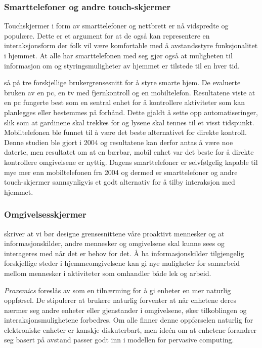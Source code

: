 {\color{blue}

\subsubsection*{Smarttelefoner og andre touch-skjermer}
Touchskjermer i form av smarttelefoner og nettbrett er nå vidspredte og populære. Dette er et argument for at de også kan representere en interaksjonsform der folk vil være komfortable med å avstandsstyre funksjonalitet i hjemmet. At alle har smarttelefonen med seg gjør også at muligheten til informasjon om og styringsmuligheter av hjemmet er tilstede til en hver tid.

\citet{koskela04} så på tre forskjellige brukergrensesnitt for å styre smarte hjem. De evaluerte bruken av en pc, en tv med fjernkontroll og en mobiltelefon. Resultatene viste at en pc fungerte best som en sentral enhet for å kontrollere aktiviteter som kan planlegges eller bestemmes på forhånd. Dette gjaldt å sette opp automatiseringer, slik som at gardinene skal trekkes for og lysene skal tennes til et visst tidspunkt. Mobiltelefonen ble funnet til å være det beste alternativet for direkte kontroll. Denne studien ble gjort i 2004 og resultatene kan derfor antas å være noe daterte, men resultatet om at en bærbar, mobil enhet var det beste for å direkte kontrollere omgivelsene er nyttig. Dagens smarttelefoner er selvfølgelig kapable til mye mer enn mobiltelefonen fra 2004 og dermed er smarttelefoner og andre touch-skjermer sannsynligvis et godt alternativ for å tilby interaksjon med hjemmet.

\subsubsection*{Omgivelsesskjermer}
\citet{rogers06} skriver at vi bør designe grensesnittene våre proaktivt mennesker og at informasjonskilder, andre mennesker og omgivelsene skal kunne sees og interageres med når det er behov for det. Å ha informasjonskilder tilgjengelig forskjellige steder i hjemmeomgivelsene kan gi nye muligheter for samarbeid mellom mennesker i aktiviteter som omhandler både lek og arbeid.

\emph{Proxemics} foreslås av \citet{greenberg11} som en tilnærming for å gi enheter en mer naturlig oppførsel. De stipulerer at brukere naturlig forventer at når enhetene deres nærmer seg andre enheter eller gjenstander i omgivelsene, øker tilkoblingen og interaksjonsmulighetene forbedres. Om alle finner denne oppførselen naturlig for elektroniske enheter er kanskje diskuterbart, men ideén om at enhetene forandrer seg basert på avstand passer godt inn i modellen for pervasive computing.

}
